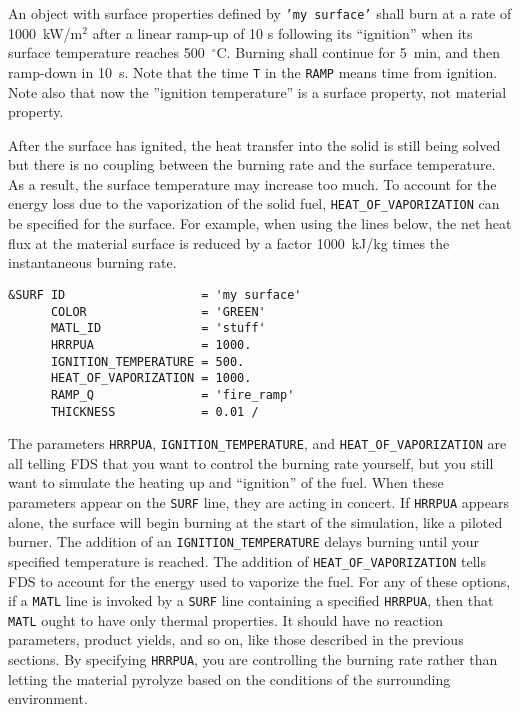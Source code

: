 \documentclass[11pt]{book}
\newcommand{\ct}{\tt\small}
\begin{document}
\noindent
An object with surface properties defined by {\ct 'my surface'} shall
burn at a rate of 1000~kW/m$^2$ after a linear ramp-up of 10 s
following its ``ignition'' when its surface temperature reaches
500~$^\circ$C. Burning shall continue for 5~min, and then ramp-down
in 10~s. Note that the time {\ct T} in the {\ct RAMP} means time from
ignition. Note also that now the ''ignition temperature'' is a surface
property, not material property.

After the surface has ignited, the heat transfer into the solid is
still being solved but there is no coupling between the burning rate
and the surface temperature. As a result, the surface temperature may
increase too much. To account for the energy loss due to the
vaporization of the solid fuel, {\ct HEAT\_OF\_VAPORIZATION} can be
specified for the surface. For example, when using the lines below,
the net heat flux at the material surface is reduced by a factor
1000~kJ/kg times the instantaneous burning rate.

\footnotesize
\begin{verbatim}
&SURF ID                   = 'my surface'
      COLOR                = 'GREEN'
      MATL_ID              = 'stuff'
      HRRPUA               = 1000.
      IGNITION_TEMPERATURE = 500.
      HEAT_OF_VAPORIZATION = 1000.
      RAMP_Q               = 'fire_ramp'
      THICKNESS            = 0.01 /
\end{verbatim} \normalsize

\noindent
The parameters {\ct HRRPUA}, {\ct IGNITION\_TEMPERATURE}, and {\ct HEAT\_OF\_VAPORIZATION} are all telling FDS that you want to control the
burning rate yourself, but you still want to simulate the heating up and ``ignition'' of the fuel. When these parameters appear on the {\ct SURF} line, they
are acting in concert. If {\ct HRRPUA} appears alone, the surface will begin burning at the start of the simulation, like a piloted burner. The addition of
an {\ct IGNITION\_TEMPERATURE} delays burning until your specified temperature is reached. The addition of {\ct HEAT\_OF\_VAPORIZATION}
tells FDS to account for the energy used to vaporize the fuel. For any of these options, if a {\ct MATL} line is invoked by a {\ct SURF} line containing
a specified {\ct HRRPUA}, then that {\ct MATL} ought to have only thermal properties. It should have no reaction parameters, product yields, and so on, like
those described in the previous sections. By specifying {\ct HRRPUA}, you are controlling the burning rate rather than letting the material pyrolyze based on
the conditions of the surrounding environment.
\end{document}
